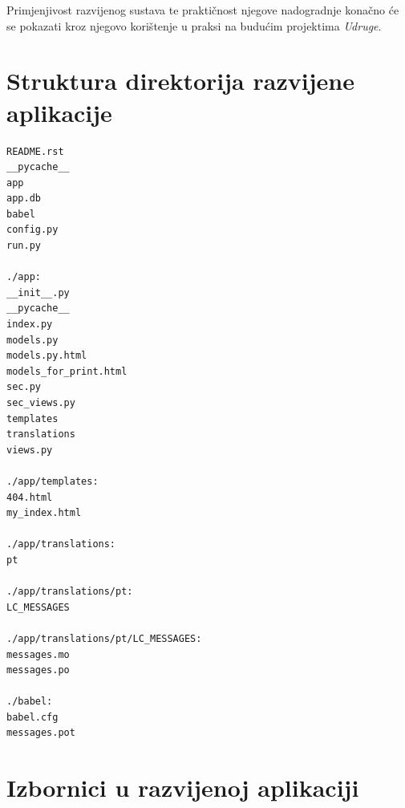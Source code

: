\documentclass[times, utf8, diplomski]{fer}
\begin{document}
Primjenjivost razvijenog sustava te praktičnost njegove nadogradnje konačno će
se pokazati kroz njegovo korištenje u praksi na budućim projektima
\emph{Udruge}.




\appendix
\chapter{Struktura direktorija razvijene aplikacije}
\begin{lstlisting}[basicstyle=\footnotesize,frame=single]
README.rst
__pycache__
app
app.db
babel
config.py
run.py

./app:
__init__.py
__pycache__
index.py
models.py
models.py.html
models_for_print.html
sec.py
sec_views.py
templates
translations
views.py

./app/templates:
404.html
my_index.html

./app/translations:
pt

./app/translations/pt:
LC_MESSAGES

./app/translations/pt/LC_MESSAGES:
messages.mo
messages.po

./babel:
babel.cfg
messages.pot
\end{lstlisting}

\chapter{Izbornici u razvijenoj aplikaciji}
\end{document}
